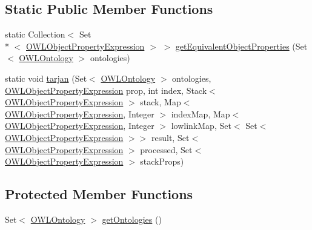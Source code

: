 \subsection*{Static Public Member Functions}
\begin{DoxyCompactItemize}
\item 
static Collection$<$ Set\\*
$<$ \hyperlink{interfaceorg_1_1semanticweb_1_1owlapi_1_1model_1_1_o_w_l_object_property_expression}{O\-W\-L\-Object\-Property\-Expression} $>$ $>$ \hyperlink{classorg_1_1semanticweb_1_1owlapi_1_1util_1_1_o_w_l_object_property_manager_ac94490f9692d853014dfeeb00ad0411a}{get\-Equivalent\-Object\-Properties} (Set$<$ \hyperlink{interfaceorg_1_1semanticweb_1_1owlapi_1_1model_1_1_o_w_l_ontology}{O\-W\-L\-Ontology} $>$ ontologies)
\item 
static void \hyperlink{classorg_1_1semanticweb_1_1owlapi_1_1util_1_1_o_w_l_object_property_manager_a78d1bc4329a15bdffddffa8b1aaaad36}{tarjan} (Set$<$ \hyperlink{interfaceorg_1_1semanticweb_1_1owlapi_1_1model_1_1_o_w_l_ontology}{O\-W\-L\-Ontology} $>$ ontologies, \hyperlink{interfaceorg_1_1semanticweb_1_1owlapi_1_1model_1_1_o_w_l_object_property_expression}{O\-W\-L\-Object\-Property\-Expression} prop, int index, Stack$<$ \hyperlink{interfaceorg_1_1semanticweb_1_1owlapi_1_1model_1_1_o_w_l_object_property_expression}{O\-W\-L\-Object\-Property\-Expression} $>$ stack, Map$<$ \hyperlink{interfaceorg_1_1semanticweb_1_1owlapi_1_1model_1_1_o_w_l_object_property_expression}{O\-W\-L\-Object\-Property\-Expression}, Integer $>$ index\-Map, Map$<$ \hyperlink{interfaceorg_1_1semanticweb_1_1owlapi_1_1model_1_1_o_w_l_object_property_expression}{O\-W\-L\-Object\-Property\-Expression}, Integer $>$ lowlink\-Map, Set$<$ Set$<$ \hyperlink{interfaceorg_1_1semanticweb_1_1owlapi_1_1model_1_1_o_w_l_object_property_expression}{O\-W\-L\-Object\-Property\-Expression} $>$$>$ result, Set$<$ \hyperlink{interfaceorg_1_1semanticweb_1_1owlapi_1_1model_1_1_o_w_l_object_property_expression}{O\-W\-L\-Object\-Property\-Expression} $>$ processed, Set$<$ \hyperlink{interfaceorg_1_1semanticweb_1_1owlapi_1_1model_1_1_o_w_l_object_property_expression}{O\-W\-L\-Object\-Property\-Expression} $>$ stack\-Props)
\end{DoxyCompactItemize}
\subsection*{Protected Member Functions}
\begin{DoxyCompactItemize}
\item 
Set$<$ \hyperlink{interfaceorg_1_1semanticweb_1_1owlapi_1_1model_1_1_o_w_l_ontology}{O\-W\-L\-Ontology} $>$ \hyperlink{classorg_1_1semanticweb_1_1owlapi_1_1util_1_1_o_w_l_object_property_manager_ad06ec187a1bf22632986fa55fc019f86}{get\-Ontologies} ()
\end{DoxyCompactItemize}
